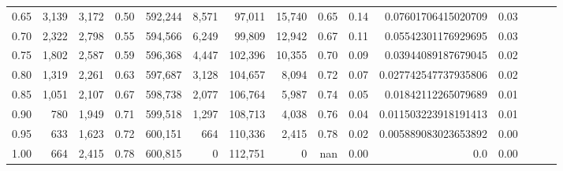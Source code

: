 \begin{tabular}{rrrrrrrrrrrrrrr}
0.65 &    3,139 &   3,172 &  0.50 &  592,244 &    8,571 &   97,011 &   15,740 &  0.65 &  0.14 &   0.07601706415020709 &      0.03 \\
0.70 &    2,322 &   2,798 &  0.55 &  594,566 &    6,249 &   99,809 &   12,942 &  0.67 &  0.11 &   0.05542301176929695 &      0.03 \\
0.75 &    1,802 &   2,587 &  0.59 &  596,368 &    4,447 &  102,396 &   10,355 &  0.70 &  0.09 &   0.03944089187679045 &      0.02 \\
0.80 &    1,319 &   2,261 &  0.63 &  597,687 &    3,128 &  104,657 &    8,094 &  0.72 &  0.07 &  0.027742547737935806 &      0.02 \\
0.85 &    1,051 &   2,107 &  0.67 &  598,738 &    2,077 &  106,764 &    5,987 &  0.74 &  0.05 &   0.01842112265079689 &      0.01 \\
0.90 &      780 &   1,949 &  0.71 &  599,518 &    1,297 &  108,713 &    4,038 &  0.76 &  0.04 &  0.011503223918191413 &      0.01 \\
0.95 &      633 &   1,623 &  0.72 &  600,151 &      664 &  110,336 &    2,415 &  0.78 &  0.02 &  0.005889083023653892 &      0.00 \\
1.00 &      664 &   2,415 &  0.78 &  600,815 &        0 &  112,751 &        0 &   nan &  0.00 &                   0.0 &      0.00 \\
\bottomrule
\end{tabular}
